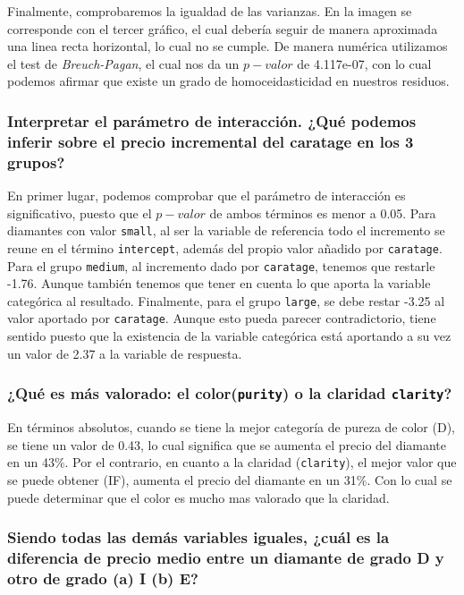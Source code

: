 \documentclass[a4paper, 9pt]{article}
\begin{document}
Finalmente, comprobaremos la igualdad de las varianzas. En la imagen se corresponde con el tercer gráfico, el cual debería seguir de manera aproximada una linea recta horizontal, lo cual no se cumple. De manera numérica utilizamos el test de \textit{Breuch-Pagan}, el cual nos da un $p-valor$ de 4.117e-07, con lo cual podemos afirmar que existe un grado de homoceidasticidad en nuestros residuos.

\subsubsection{Interpretar el parámetro de interacción. ¿Qué podemos inferir sobre el precio incremental del caratage en los 3 grupos?}

En primer lugar, podemos comprobar que el parámetro de interacción es significativo, puesto que el $p-valor$ de ambos términos es menor a 0.05.  Para diamantes con valor \texttt{small}, al ser la variable de referencia todo el incremento se reune en el término \texttt{intercept}, además del propio valor añadido por \texttt{caratage}. Para el grupo \texttt{medium}, al incremento dado por \texttt{caratage}, tenemos que restarle -1.76. Aunque también tenemos que tener en cuenta lo que aporta la variable categórica al resultado. Finalmente, para el grupo \texttt{large}, se debe restar -3.25 al valor aportado por \texttt{caratage}. Aunque esto pueda parecer contradictorio, tiene sentido puesto que la existencia de la variable categórica está aportando a su vez un valor de 2.37 a la variable de respuesta.

\subsubsection{¿Qué es más valorado: el color(\texttt{purity}) o la claridad \texttt{clarity}? }

En términos absolutos, cuando se tiene la mejor categoría de pureza de color (D), se tiene un valor de 0.43, lo cual significa que se aumenta el precio del diamante en un 43\%. Por el contrario, en cuanto a la claridad (\texttt{clarity}), el mejor valor que se puede obtener (IF), aumenta el precio del diamante en un 31\%.  Con lo cual se puede determinar que el color es mucho mas valorado que la claridad.

\subsubsection{Siendo todas las demás variables iguales, ¿cuál es la diferencia de precio medio entre un diamante de grado D y otro de grado (a) I (b) E? }
\end{document}
